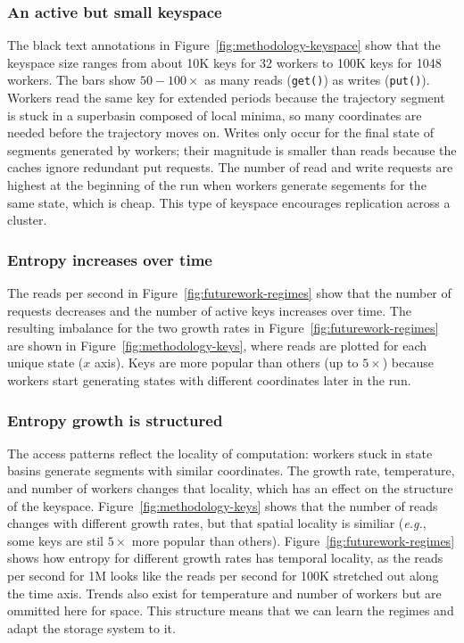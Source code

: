\subsubsection*{An active but small keyspace} The black text annotations in
Figure~\ref{fig:methodology-keyspace} show that the keyspace size ranges from
about 10K keys for 32 workers to 100K keys for 1048 workers.  The bars show
\(50-100\times\) as many reads (\texttt{get()}) as writes (\texttt{put()}).
Workers read the same key for extended periods because the trajectory segment
is stuck in a superbasin composed of local minima, so many coordinates are
needed before the trajectory moves on. Writes only occur for the final state of
segments generated by workers; their magnitude is smaller than reads because
the caches ignore redundant put requests. The number of read and write requests
are highest at the beginning of the run when workers generate segements for the
same state, which is cheap. This type of keyspace encourages replication across
a cluster.  

\subsubsection*{Entropy increases over time} The reads per second in
Figure~\ref{fig:futurework-regimes} show that the number of requests decreases
and the number of active keys increases over time. The resulting imbalance for
the two growth rates in Figure~\ref{fig:futurework-regimes} are shown in
Figure~\ref{fig:methodology-keys}, where reads are plotted for each unique
state (\(x\) axis). Keys are more popular than others (up to \(5\times\))
because workers start generating states with different coordinates later in the
run.

\subsubsection*{Entropy growth is structured} The access patterns reflect the
locality of computation: workers stuck in state basins generate segments with
similar coordinates. The growth rate, temperature, and number of workers
changes that locality, which has an effect on the structure of the keyspace.
Figure~\ref{fig:methodology-keys} shows that the number of reads changes with
different growth rates, but that spatial locality is similiar ({\it e.g.}, some
keys are stil \(5\times\) more popular than others).
Figure~\ref{fig:futurework-regimes} shows how entropy for different growth
rates has temporal locality, as the reads per second for 1M looks like the
reads per second for 100K stretched out along the time axis.  Trends also exist
for temperature and number of workers but are ommitted here for space. This
structure means that we can learn the regimes and adapt the storage system to
it. 

